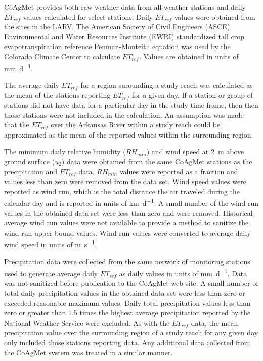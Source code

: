 CoAgMet provides both raw weather data from all weather stations and daily $ET_{ref}$ values calculated for select stations.  Daily $ET_{ref}$ values were obtained from the sites in the LARV.  The American Society of Civil Engineers (ASCE) Environmental and Water Resources Institute (EWRI) standardized tall crop evapotranspiration reference Penman-Monteith equation was used by the Colorado Climate Center to calculate $ET_{ref}$.  Values are obtained in units of \si{\milli\meter\per\day}.  

The average daily $ET_{ref}$ for a region surounding a study reach was calculated as the mean of the stations reporting $ET_{ref}$ for a given day. If a station or group of stations did not have data for a particular day in the study time frame, then then those stations were not included in the calculation.  An assumption was made that the $ET_{ref}$ over the Arkansas River within a study reach could be approximated as the mean of the reported values within the surrounding region.

The minimum daily relative humidity ($RH_{min}$) and wind speed at \SI{2}{\meter} above ground surface ($u_2$) data were obtained from the same CoAgMet stations as the precipitation and $ET_{ref}$ data.  $RH_{min}$ values were reported as a fraction and values less than zero were removed from the data set.  Wind speed values were reported as wind run, which is the total distance the air traveled during the calendar day and is reported in units of \si{\kilo\meter\per\day}.  A small number of the wind run values in the obtained data set were less than zero and were removed.  Historical average wind run values were not available to provide a method to sanitize the wind run upper bound values.  Wind run values were converted to average daily wind speed in units of \si{\meter\per\second}.

Precipitation data were collected from the same network of monitoring stations used to generate average daily $ET_{ref}$ as daily values in units of \si{\milli\meter\per\day}.  Data was not sanitized before publication to the CoAgMet web site.  A small number of total daily precipitation values in the obtained data set were less than zero or exceeded reasonable maximum values.   Daily total precipitation values less than zero or greater than 1.5 times the highest average precipitation reported by the National Weather Service were excluded.  As with the $ET_{ref}$ data, the mean precipitation value over the surrounding region of a study reach for any given day only included those stations reporting data.  Any additional data collected from the CoAgMet system was treated in a similar manner.
\clearpage{}